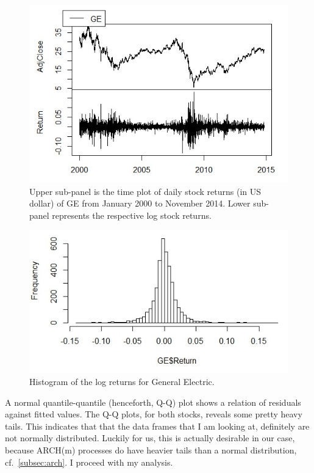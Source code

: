 \documentclass[a4paper,11pt,english]{article}
\begin{document}
			\begin{figure}
				\begin{center}
					\includegraphics[scale=0.6]{GE.JPG}
					\caption{Upper sub-panel is the time plot of daily stock returns (in US dollar) of GE from January 2000 to November 2014. Lower 
					sub-panel represents the respective log stock returns.}
					\label{fig:ge}
				\end{center}	
			\end{figure}

			\begin{figure}
				\begin{center}
					\includegraphics[scale=0.6]{HistGE.JPG}
					\caption{Histogram of the log returns for General Electric.}
					\label{fig:histge}
				\end{center}
			\end{figure}
			
			A normal quantile-quantile (henceforth, Q-Q) plot shows a relation of residuals against fitted values. The Q-Q plots, for both stocks, reveals 
			some pretty heavy tails. This indicates that that the data frames that I am looking at, definitely are not normally distributed. Luckily for 
			us, this is actually desirable in our case, because ARCH(m) processes do have heavier tails than a normal distribution, cf.~\ref{subsec:arch}. 
			I proceed with my analysis. 
	
\end{document}
